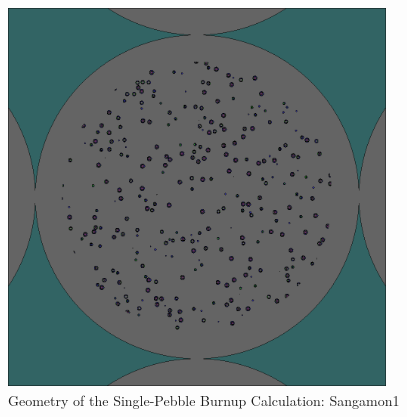 \begin{figure}[h!]
\centering
\includegraphics[width = 10cm]{figures/burn-20.png}
\caption{Geometry of the Single-Pebble Burnup Calculation: Sangamon1}
\label{fig:burn-20}
\end{figure}